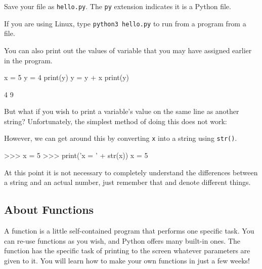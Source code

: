 \documentclass[11pt]{cselabheader}
\begin{document}
Save your file as \texttt{hello.py}. The \texttt{py} extension indicates it is a
Python file.

If you are using Linux, type \texttt{python3 hello.py} to run from a program
from a file.


You can also print out the values of variable that you may have assigned earlier
in the program.

\begin{python3code}
x = 5
y = 4
print(y)
y = y + x
print(y)
\end{python3code}

\begin{verbatimcode}
4
9
\end{verbatimcode}

But what if you wish to print a variable's value on the same line as another
string? Unfortunately, the simplest method of doing this does not work:


However, we can get around this by converting \texttt{x} into a string using
\texttt{str()}.

\begin{pyconcode}
>>> x = 5
>>> print('x = ' + str(x))
x = 5
\end{pyconcode}

At this point it is not necessary to completely understand the differences
between a string and an actual number, just remember that 
and  denote different things.

\subsection{About Functions}

A function is a little self-contained program that performs one specific task.
You can re-use functions as you wish, and Python offers many built-in ones. The
function  has the specific task of printing to the screen
whatever parameters are given to it. You will learn how to make your own
functions in just a few weeks!
\end{document}
